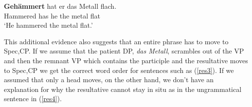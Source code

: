 \documentclass[letterpaper,parskip=half]{scrartcl}
\begin{document}
\begin{exe}
\ex \label{res4} \gll  * \textbf{Gehämmert} hat er das Metall flach. \\
{} Hammered has he the metal flat\\
`He hammered the metal flat.'
\end{exe}

This additional evidence also suggests that an entire phrase has to move to Spec,CP. If we assume that the patient DP, \textit{das Metall}, scrambles out of the VP and then the remnant VP which contains the participle and the resultative moves to Spec,CP we get the correct word order for sentences such as (\ref{res3}). If we assumed that only a head moves, on the other hand, we don't have an explanation for why the resultative cannot stay in situ as in the ungrammatical sentence in (\ref{res4}).




















\end{document}
